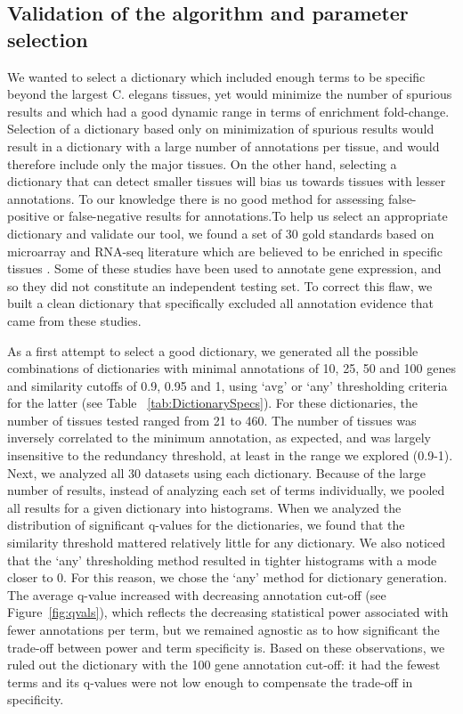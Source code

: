 \documentclass[linenumbers, doublespacing]{bmcart}
\begin{document}
\subsection*{Validation of the algorithm and parameter selection}
	We wanted to select a dictionary which included enough terms to be specific beyond the largest C. elegans tissues, yet would minimize the number of spurious results and which had a good dynamic range in terms of enrichment fold-change. Selection of a dictionary based only on minimization of spurious results would result in a dictionary with a large number of annotations per tissue, and would therefore include only the major tissues. On the other hand, selecting a dictionary that can detect smaller tissues will bias us towards tissues with lesser annotations. To our knowledge there is no good method for assessing false-positive or false-negative results for annotations.To help us select an appropriate dictionary and validate our tool, we found a set of 30 gold standards based on microarray and RNA-seq literature which are believed to be enriched in specific tissues \cite{Gaudet2004a, Spencer2011, Cinar2005, Watson2008a, Pauli2006, Portman2004, Fox2007, Smith2010}. Some of these studies have been used to annotate gene expression, and so they did not constitute an independent testing set. To correct this flaw, we built a clean dictionary that specifically excluded all annotation evidence that came from these studies.

	As a first attempt to select a good dictionary, we generated all the possible combinations of dictionaries with minimal annotations of 10, 25, 50 and 100 genes and similarity cutoffs of 0.9, 0.95 and 1, using `avg' or `any' thresholding criteria for the latter (see Table ~\ref{tab:DictionarySpecs}). For these dictionaries, the number of tissues tested ranged from 21 to 460. The number of tissues was inversely correlated to the minimum annotation, as expected, and was largely insensitive to the redundancy threshold, at least in the range we explored (0.9-1). Next, we analyzed all 30 datasets using each dictionary. Because of the large number of results, instead of analyzing each set of terms individually, we pooled all results for a given dictionary into histograms. When we analyzed the distribution of significant q-values for the dictionaries, we found that the similarity threshold mattered relatively little for any dictionary. We also noticed that the `any' thresholding method resulted in tighter histograms with a mode closer to 0. For this reason, we chose the `any' method for dictionary generation. The average q-value increased with decreasing annotation cut-off (see Figure~\ref{fig:qvals}), which reflects the decreasing statistical power associated with fewer annotations per term, but we remained agnostic as to how significant the trade-off between power and term specificity is. Based on these observations, we ruled out the dictionary with the 100 gene annotation cut-off: it had the fewest terms and its q-values were not low enough to compensate the trade-off in specificity.
\end{document}
